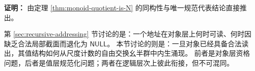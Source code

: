 \textbf{证明：}
由定理 \ref{thm:monoid-quotient-is-N} 的同构性与唯一规范代表结论直接推出。

\begin{remark}\label{rem:emergent-arithmetic-object-value-interface}
第 \ref{sec:recursive-addressing} 节讨论的是：一个地址在对象层上何时可读、何时因缺乏合法局部截面而退化为 \(\mathsf{NULL}\)。
本节讨论的则是：一旦对象已经具备合法读出，其值结构如何从尺度计数的自由交换幺半群中内生涌现。
前者是对象层资格问题，后者是值层规范化问题；两者在逻辑层次上彼此衔接，但不可混同。
\end{remark}
